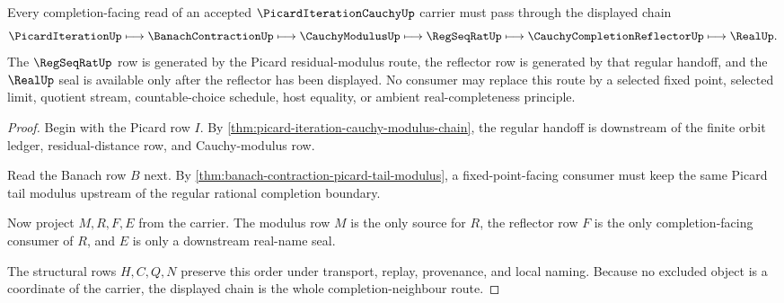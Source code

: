 \begin{theorem}
\label{thm:picard-iteration-cauchy-contraction-route}
Every completion-facing read of an accepted $\PicardIterationCauchyUp$ carrier must pass through the displayed chain
$$
\PicardIterationUp \longmapsto \BanachContractionUp \longmapsto \CauchyModulusUp \longmapsto \RegSeqRatUp \longmapsto \CauchyCompletionReflectorUp \longmapsto \RealUp .
$$
The $\RegSeqRatUp$ row is generated by the Picard residual-modulus route, the reflector row is generated by that regular handoff, and the $\RealUp$ seal is available only after the reflector has been displayed. No consumer may replace this route by a selected fixed point, selected limit, quotient stream, countable-choice schedule, host equality, or ambient real-completeness principle.
\end{theorem}
\begin{proof}
Begin with the Picard row $I$. By \autoref{thm:picard-iteration-cauchy-modulus-chain}, the regular handoff is downstream of the finite orbit ledger, residual-distance row, and Cauchy-modulus row.

Read the Banach row $B$ next. By \autoref{thm:banach-contraction-picard-tail-modulus}, a fixed-point-facing consumer must keep the same Picard tail modulus upstream of the regular rational completion boundary.

Now project $M,R,F,E$ from the carrier. The modulus row $M$ is the only source for $R$, the reflector row $F$ is the only completion-facing consumer of $R$, and $E$ is only a downstream real-name seal.

The structural rows $H,C,Q,N$ preserve this order under transport, replay, provenance, and local naming. Because no excluded object is a coordinate of the carrier, the displayed chain is the whole completion-neighbour route.
\end{proof}



